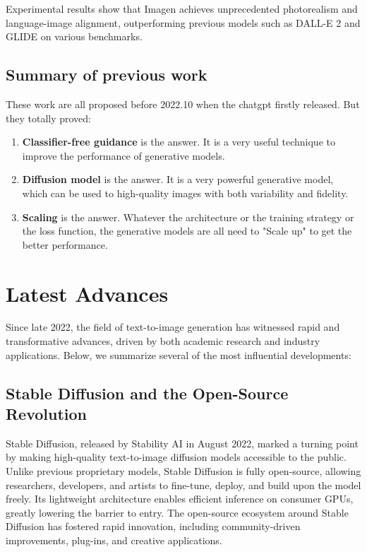 \documentclass{article}
\begin{document}
Experimental results show that Imagen achieves unprecedented photorealism and language-image alignment, 
outperforming previous models such as DALL-E 2 and GLIDE on various benchmarks. 


\subsection{Summary of previous work}
These work are all proposed before 2022.10 when the chatgpt firstly released. But they totally proved:
\begin{enumerate}
    \item \textbf{Classifier-free guidance} is the answer. It is a very useful technique to improve the performance of generative models.
    \item \textbf{Diffusion model} is the answer. It is a very powerful generative model, which can be used to high-quality images 
    with both variability and fidelity.
    \item \textbf{Scaling} is the answer. Whatever the architecture or the training strategy or the loss function, the generative models are all 
    need to "Scale up" to get the better performance.
\end{enumerate}


\section{Latest Advances}

Since late 2022, the field of text-to-image generation has witnessed rapid and transformative advances, driven by both academic research and industry applications. Below, we summarize several of the most influential developments:

\subsection{Stable Diffusion and the Open-Source Revolution}
Stable Diffusion, released by Stability AI in August 2022, marked a turning point by making high-quality text-to-image diffusion models accessible to the public. Unlike previous proprietary models, Stable Diffusion is fully open-source, allowing researchers, developers, and artists to fine-tune, deploy, and build upon the model freely. Its lightweight architecture enables efficient inference on consumer GPUs, greatly lowering the barrier to entry. The open-source ecosystem around Stable Diffusion has fostered rapid innovation, including community-driven improvements, plug-ins, and creative applications.
\end{document}

